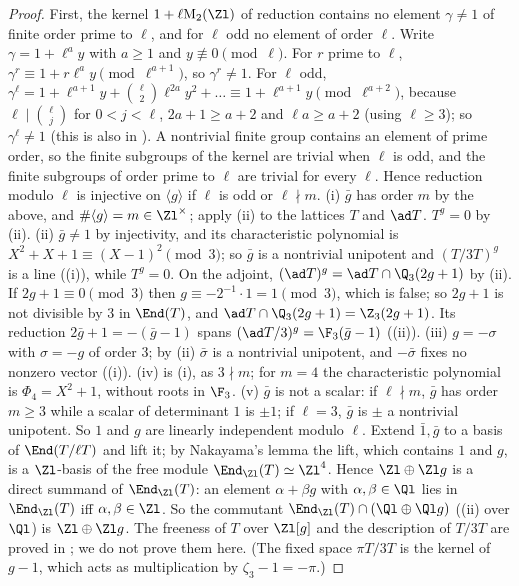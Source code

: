 \begin{proof}
First, the kernel $1+\ell\mathrm M_2(\Zl)$ of reduction contains no element $\gamma\ne1$ of finite order prime to $\ell$, and for $\ell$ odd no element of order $\ell$.
Write $\gamma=1+\ell^ay$ with $a\ge1$ and $y\not\equiv0\pmod\ell$. For $r$ prime to $\ell$, $\gamma^r\equiv1+r\ell^ay\pmod{\ell^{a+1}}$, so $\gamma^r\ne1$. For $\ell$ odd,
$\gamma^\ell=1+\ell^{a+1}y+\binom\ell2\ell^{2a}y^2+\dots\equiv1+\ell^{a+1}y\pmod{\ell^{a+2}}$, because $\ell\mid\binom\ell j$ for $0<j<\ell$, $2a+1\ge a+2$ and $\ell a\ge a+2$ (using
$\ell\ge3$); so $\gamma^\ell\ne1$ (this is also in ). A nontrivial finite group contains an element of prime order, so the finite
subgroups of the kernel are trivial when $\ell$ is odd, and the finite subgroups of order prime to $\ell$ are trivial for every $\ell$. Hence
reduction modulo $\ell$ is injective on $\langle g\rangle$ if $\ell$ is odd or $\ell\nmid m$.
(i) $\bar g$ has order $m$ by the above, and $\#\langle g\rangle=m\in\Zl^\times$; apply (ii) to the lattices $T$ and $\ad T$. $T^g=0$ by
(ii).
(ii) $\bar g\ne1$ by injectivity, and its characteristic polynomial is $X^2+X+1\equiv(X-1)^2\pmod3$; so $\bar g$ is a nontrivial unipotent and
$(T/3T)^g$ is a line ((i)), while $T^g=0$. On the adjoint, $(\ad T)^g=\ad T\cap\Q_3(2g+1)$ by
(ii). If $2g+1\equiv0\pmod3$ then $g\equiv-2^{-1}\cdot1=1\pmod 3$, which is false; so $2g+1$ is not divisible by $3$ in $\End(T)$, and
$\ad T\cap\Q_3(2g+1)=\Z_3(2g+1)$. Its reduction $2\bar g+1=-(\bar g-1)$ spans $(\ad T/3)^g=\F_3(\bar g-1)$ ((ii)).
(iii) $g=-\sigma$ with $\sigma=-g$ of order $3$; by (ii) $\bar\sigma$ is a nontrivial unipotent, and $-\bar\sigma$ fixes no nonzero vector
((i)).
(iv) is (i), as $3\nmid m$; for $m=4$ the characteristic polynomial is $\Phi_4=X^2+1$, without roots in $\F_3$.
(v) $\bar g$ is not a scalar: if $\ell\nmid m$, $\bar g$ has order $m\ge3$ while a scalar of determinant $1$ is $\pm1$; if $\ell=3$, $\bar g$ is $\pm$ a nontrivial
unipotent. So $1$ and $g$ are linearly independent modulo $\ell$. Extend $\bar1,\bar g$ to a basis of $\End(T/\ell T)$ and lift it; by Nakayama's lemma the
lift, which contains $1$ and $g$, is a $\Zl$-basis of the free module $\End_{\Zl}(T)\simeq\Zl^4$. Hence $\Zl\oplus\Zl g$ is a direct summand of $\End_{\Zl}(T)$:
an element $\alpha+\beta g$ with $\alpha,\beta\in\Ql$ lies in $\End_{\Zl}(T)$ iff $\alpha,\beta\in\Zl$. So the commutant
$\End_{\Zl}(T)\cap(\Ql\oplus\Ql g)$ ((ii) over $\Ql$) is $\Zl\oplus\Zl g$. The freeness of $T$ over $\Zl[g]$ and the description of
$T/3T$ are proved in ; we do not prove them here. (The fixed space $\pi T/3T$ is the kernel of $g-1$, which acts as multiplication by $\zeta_3-1=-\pi$.)
\end{proof}


